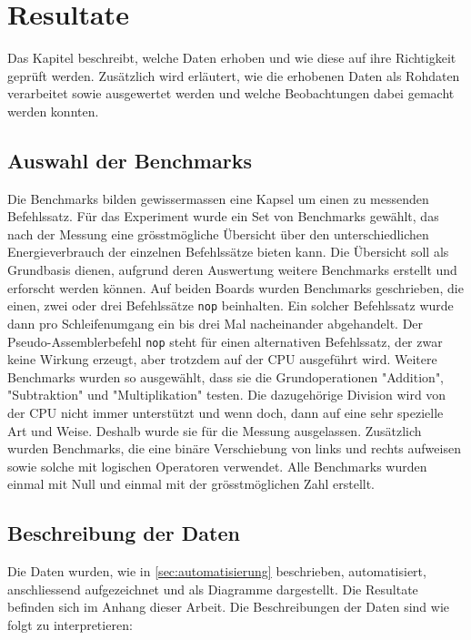 \chapter{Resultate}

Das Kapitel beschreibt, welche Daten erhoben und wie diese auf ihre Richtigkeit geprüft werden. Zusätzlich wird erläutert, wie die erhobenen Daten als Rohdaten verarbeitet sowie ausgewertet werden und welche Beobachtungen dabei gemacht werden konnten.


\section{Auswahl der Benchmarks}

Die Benchmarks bilden gewissermassen eine Kapsel um einen zu messenden Befehlssatz. Für das Experiment wurde ein Set von Benchmarks gewählt, das nach der Messung eine grösstmögliche Übersicht über den unterschiedlichen Energieverbrauch der einzelnen Befehlssätze bieten kann. Die Übersicht soll als Grundbasis dienen, aufgrund deren Auswertung weitere Benchmarks erstellt und erforscht werden können. Auf beiden Boards wurden Benchmarks geschrieben, die einen, zwei oder drei Befehlssätze \texttt{nop} beinhalten. Ein solcher Befehlssatz wurde dann pro Schleifenumgang ein bis drei Mal nacheinander abgehandelt. Der Pseudo-Assemblerbefehl \texttt{nop} steht für einen alternativen Befehlssatz, der zwar keine Wirkung erzeugt, aber trotzdem auf der CPU ausgeführt wird. Weitere Benchmarks wurden so ausgewählt, dass sie die Grundoperationen "Addition", "Subtraktion" und "Multiplikation" testen. Die dazugehörige Division wird von der CPU nicht immer unterstützt und wenn doch, dann auf eine sehr spezielle Art und Weise. Deshalb wurde sie für die Messung ausgelassen. Zusätzlich wurden Benchmarks, die eine binäre Verschiebung von links und rechts aufweisen sowie solche mit logischen Operatoren verwendet. Alle Benchmarks wurden einmal mit Null und einmal mit der grösstmöglichen Zahl erstellt.




\section{Beschreibung der Daten}

Die Daten wurden, wie in \autoref{sec:automatisierung} beschrieben, automatisiert, anschliessend aufgezeichnet und als Diagramme dargestellt. Die Resultate befinden sich im Anhang dieser Arbeit. Die Beschreibungen der Daten sind wie folgt zu interpretieren:


